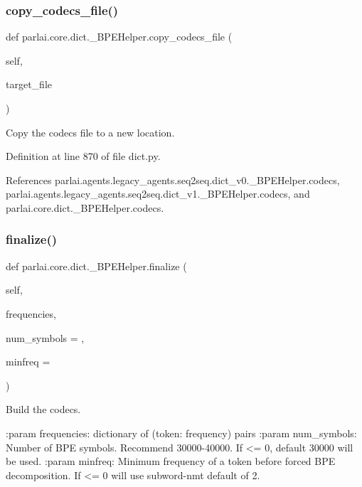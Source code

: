 \subsubsection{\texorpdfstring{copy\+\_\+codecs\+\_\+file()}{copy\_codecs\_file()}}
{\footnotesize\ttfamily def parlai.\+core.\+dict.\+\_\+\+B\+P\+E\+Helper.\+copy\+\_\+codecs\+\_\+file (\begin{DoxyParamCaption}\item[{}]{self,  }\item[{}]{target\+\_\+file }\end{DoxyParamCaption})}

\begin{DoxyVerb}Copy the codecs file to a new location.\end{DoxyVerb}
 

Definition at line 870 of file dict.\+py.



References parlai.\+agents.\+legacy\+\_\+agents.\+seq2seq.\+dict\+\_\+v0.\+\_\+\+B\+P\+E\+Helper.\+codecs, parlai.\+agents.\+legacy\+\_\+agents.\+seq2seq.\+dict\+\_\+v1.\+\_\+\+B\+P\+E\+Helper.\+codecs, and parlai.\+core.\+dict.\+\_\+\+B\+P\+E\+Helper.\+codecs.

\mbox{\label{classparlai_1_1core_1_1dict_1_1__BPEHelper_ae93cf51522695ac3f45fc19eee94f64c}} 
\subsubsection{\texorpdfstring{finalize()}{finalize()}}
{\footnotesize\ttfamily def parlai.\+core.\+dict.\+\_\+\+B\+P\+E\+Helper.\+finalize (\begin{DoxyParamCaption}\item[{}]{self,  }\item[{}]{frequencies,  }\item[{}]{num\+\_\+symbols = {},  }\item[{}]{minfreq = {} }\end{DoxyParamCaption})}

\begin{DoxyVerb}Build the codecs.

:param frequencies:
    dictionary of (token: frequency) pairs
:param num_symbols:
    Number of BPE symbols. Recommend 30000-40000.  If <= 0, default
    30000 will be used.
:param minfreq:
    Minimum frequency of a token before forced BPE decomposition. If <=
    0 will use subword-nmt default of 2.
\end{DoxyVerb}
 

